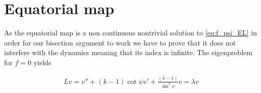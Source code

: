 \section*{Equatorial map}

As the equatorial map is a non continuous nontrivial solution to
\eqref{eq:f_psi_EL} in order for our bisection argument to work we
have to prove that it does not interfere with the dynamics meaning
that its index is infinite. The eigenproblem for $f=0$ yields

\begin{align*}
  Lv=v''+(k-1)\cot{\psi}v'+\frac{(k-1)}{\sin^2\psi}v=\lambda v
\end{align*}


